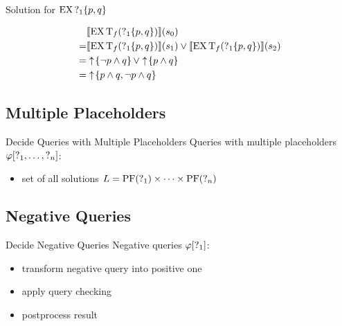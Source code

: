\begin{frame}{Solution for $\operatorname{EX} \operatorname{?}_1\{p,q\}$}
  \begin{example}
    \begin{align*}
      & \llbracket \operatorname{EX} \operatorname{T}_f( \operatorname{?}_1\{p,q\}) \rrbracket (s_0) \\
        =& \llbracket \operatorname{EX} \operatorname{T}_f( \operatorname{?}_1\{p,q\}) \rrbracket (s_1) \lor \llbracket \operatorname{EX} \operatorname{T}_f( \operatorname{?}_1\{p,q\}) \rrbracket (s_2) \\
        =& \uparrow \! \left\{ \lnot p\land q \right\} \lor \uparrow \! \left\{ p\land q \right\} \\
        =& \uparrow \! \left\{ p\land q, \lnot p\land q \right\} 
    \end{align*}
  \end{example}
\end{frame}

\subsection{Multiple Placeholders}%

\begin{frame}{Decide Queries with Multiple Placeholders}
  Queries with multiple placeholders $\varphi[\operatorname{?}_1,\ldots,\operatorname{?}_n]$:
  \begin{itemize}
    \item set of all solutions $L = \operatorname{PF}(\operatorname{?}_1)\times \cdots \times \operatorname{PF}(\operatorname{?}_n)$
  \end{itemize}
\end{frame}




\subsection{Negative Queries}%

\begin{frame}{Decide Negative Queries}
  Negative queries $\varphi[\operatorname{?}_1]$:
  \begin{itemize}
    \item transform negative query into positive one
    \item apply query checking
    \item postprocess result
  \end{itemize}
\end{frame}

